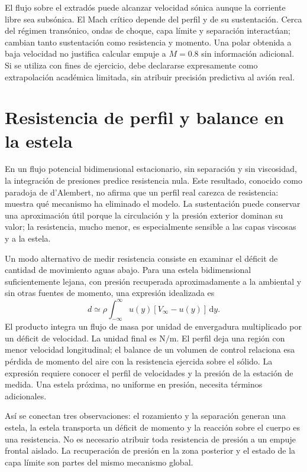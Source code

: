 El flujo sobre el extradós puede alcanzar velocidad sónica aunque la corriente libre sea subsónica. El Mach crítico depende del perfil y de su sustentación. Cerca del régimen transónico, ondas de choque, capa límite y separación interactúan; cambian tanto sustentación como resistencia y momento. Una polar obtenida a baja velocidad no justifica calcular empuje a $M=0.8$ sin información adicional. Si se utiliza con fines de ejercicio, debe declararse expresamente como extrapolación académica limitada, sin atribuir precisión predictiva al avión real.

\section{Resistencia de perfil y balance en la estela}
En un flujo potencial bidimensional estacionario, sin separación y sin viscosidad, la integración de presiones predice resistencia nula. Este resultado, conocido como paradoja de d'Alembert, no afirma que un perfil real carezca de resistencia: muestra qué mecanismo ha eliminado el modelo. La sustentación puede conservar una aproximación útil porque la circulación y la presión exterior dominan su valor; la resistencia, mucho menor, es especialmente sensible a las capas viscosas y a la estela.

Un modo alternativo de medir resistencia consiste en examinar el déficit de cantidad de movimiento aguas abajo. Para una estela bidimensional suficientemente lejana, con presión recuperada aproximadamente a la ambiental y sin otras fuentes de momento, una expresión idealizada es
\begin{equation}
d\simeq\rho\int_{-\infty}^{\infty}u(y)[V_\infty-u(y)]\,\mathrm dy.
\end{equation}
El producto integra un flujo de masa por unidad de envergadura multiplicado por un déficit de velocidad. La unidad final es $\mathrm{N/m}$. El perfil deja una región con menor velocidad longitudinal; el balance de un volumen de control relaciona esa pérdida de momento del aire con la resistencia ejercida sobre el sólido. La expresión requiere conocer el perfil de velocidades y la presión de la estación de medida. Una estela próxima, no uniforme en presión, necesita términos adicionales.

Así se conectan tres observaciones: el rozamiento y la separación generan una estela, la estela transporta un déficit de momento y la reacción sobre el cuerpo es una resistencia. No es necesario atribuir toda resistencia de presión a un empuje frontal aislado. La recuperación de presión en la zona posterior y el estado de la capa límite son partes del mismo mecanismo global.

